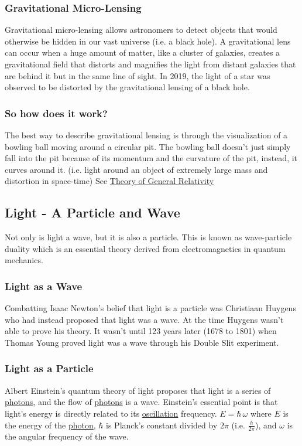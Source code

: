 \documentclass{article}
\begin{document}
\subsubsection{Gravitational Micro-Lensing}
Gravitational micro-lensing allows astronomers to detect objects that would otherwise be hidden in our vast universe (i.e. a black hole). A gravitational lens can occur when a huge amount of matter, like a cluster of galaxies, creates a gravitational field that distorts and magnifies the light from distant galaxies that are behind it but in the same line of sight. In 2019, the light of a star was observed to be distorted by the gravitational lensing of a black hole.

\subsubsection{So how does it work?}
The best way to describe gravitational lensing is through the visualization of a bowling ball moving around a circular pit. The bowling ball doesn't just simply fall into the pit because of its momentum and the curvature of the pit, instead, it curves around it. (i.e. light around an object of extremely large mass and distortion in space-time) See \hyperref[sec:generalrelativity]{Theory of General Relativity}

\subsection{Light - A Particle and Wave}
Not only is light a wave, but it is also a particle. This is known as wave-particle duality which is an essential theory derived from electromagnetics in quantum mechanics.

\subsubsection{Light as a Wave}
Combatting Isaac Newton's belief that light is a particle was Christiaan Huygens who had instead proposed that light was a wave. At the time Huygens wasn't able to prove his theory. It wasn't until 123 years later (1678 to 1801) when Thomas Young proved light was a wave through his Double Slit experiment.

\subsubsection{Light as a Particle}
Albert Einstein's quantum theory of light proposes that light is a series of \hyperref[sec:photons]{photons}, and the flow of \hyperref[sec:photons]{photons} is a wave. Einstein's essential point is that light's energy is directly related to its \hyperref[sec:oscillation]{oscillation} frequency. $E = \hbar\,\omega$ where $E$ is the energy of the \hyperref[sec:photons]{photon}, $\hbar$ is Planck's constant divided by $2\pi$ (i.e. $\frac{h}{2\pi}$), and $\omega$ is the angular frequency of the wave.
\end{document}
